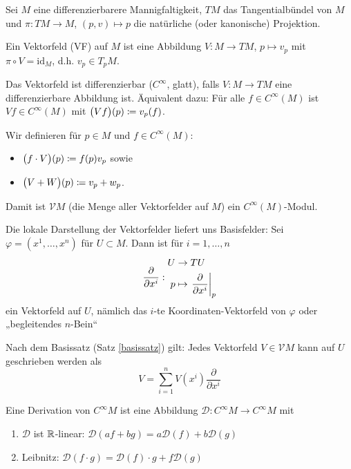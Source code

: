 \documentclass[a4paper,twoside,DIV15,BCOR12mm]{scrbook}
\newcommand{\V}{\mathcal V}
\begin{document}
\begin{definition}
Sei $M$ eine differenzierbarere Mannigfaltigkeit, $TM$ das Tangentialbündel von $M$ und $\pi: TM \to M$, $(p,v)\mapsto p$ die natürliche (oder kanonische) Projektion.

Ein Vektorfeld (VF) auf $M$ ist eine Abbildung $V : M \to TM$, $p\mapsto v_p$ mit $\pi \circ V = \text{id}_M$, d.h. $v_p \in T_pM$.

Das Vektorfeld ist differenzierbar ($C^\infty$, glatt), falls $V: M \to TM$ eine differenzierbare Abbildung ist. Äquivalent dazu: Für alle $f\in C^\infty(M)$ ist $Vf\in C^\infty(M)$ mit $\big(Vf\big)(p) \da v_p(f)$.

Wir definieren für $p\in M$ und $f\in C^\infty(M)$:
\begin{itemize}
\item $\big(f\cdot V\big)(p) \da f(p) v_p$ sowie
\item $\big(V+W\big)(p) \da v_p + w_p$.
\end{itemize}
Damit ist $\V M$ (die Menge aller Vektorfelder auf $M$) ein $C^\infty(M)$-Modul.
\end{definition}

Die lokale Darstellung der Vektorfelder liefert uns Basisfelder:
Sei $\varphi = (x^1,\ldots,x^n)$ für $U\subset M$. Dann ist für $i=1,\ldots,n$
\[
\frac{\partial}{\partial x^i}:
\begin{aligned}
U&\to TU\\
p&\mapsto \left.\frac{\partial}{\partial x^{i}}\right|_p
\end{aligned}
\]
ein Vektorfeld auf $U$, nämlich das $i$-te Koordinaten-Vektorfeld von $\varphi$ oder „begleitendes $n$-Bein“

Nach dem Basissatz (Satz \ref{basissatz}) gilt: Jedes Vektorfeld $V\in \V M $ kann auf $U$ geschrieben werden als 
\[
V = \sum_{i=1}^n V(x^i) \frac{\partial}{\partial x^i}
\]

\begin{definition}
Eine Derivation von $C^\infty M$ ist eine Abbildung $\mathcal{D}: C^\infty M \to C^\infty M$ mit
\begin{enumerate}[(D1)]
\item $\mathcal{D}$ ist $\mathbb{R}$-linear: $\mathcal{D}(af+ bg) = a\mathcal D(f) + b\mathcal D(g)$
\item Leibnitz: $\mathcal D(f\cdot g) = \mathcal D(f)\cdot g + f\mathcal D(g)$
\end{enumerate}
\end{definition}
\end{document}
